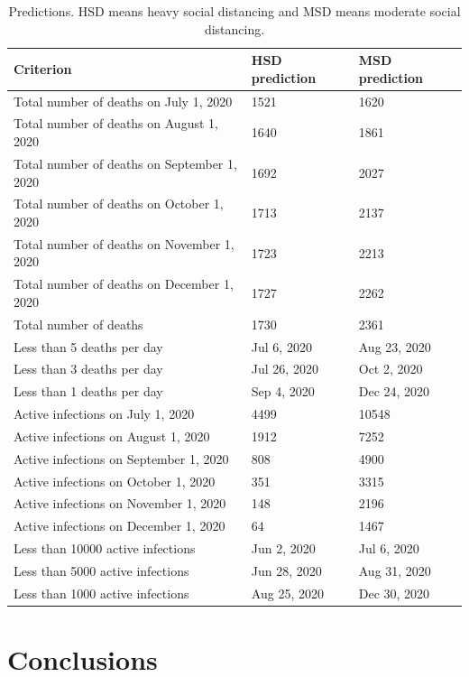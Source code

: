 \documentclass[11pt]{article}
\begin{document}
\begin{table}[H]
  \caption{Predictions. HSD means heavy social distancing and MSD means moderate social distancing.}
  \label{table:predictions}
  \centering
  \begin{tabular}{lll}
    \toprule
    Criterion & HSD prediction & MSD prediction \\
    \midrule
    Total number of deaths on July 1, 2020 & 1521 & 1620\\
    Total number of deaths on August 1, 2020 & 1640 & 1861\\
    Total number of deaths on September 1, 2020 & 1692 & 2027\\
    Total number of deaths on October 1, 2020 & 1713 & 2137\\
    Total number of deaths on November 1, 2020 & 1723 & 2213\\
    Total number of deaths on December 1, 2020 & 1727 & 2262\\
    Total number of deaths & 1730 & 2361 \\
    
    Less than 5 deaths per day & Jul 6, 2020 & Aug 23, 2020 \\
    Less than 3 deaths per day & Jul 26, 2020 & Oct 2, 2020 \\
    Less than 1 deaths per day & Sep 4, 2020 & Dec 24, 2020 \\
    \midrule
    Active infections on July 1, 2020 & 4499 & 10548 \\
    Active infections on August 1, 2020 & 1912 & 7252 \\
    Active infections on September 1, 2020 & 808 & 4900 \\
    Active infections on October 1, 2020 & 351 & 3315 \\
    Active infections on November 1, 2020 & 148 & 2196 \\
    Active infections on December 1, 2020 & 64 & 1467 \\
    
    Less than 10000 active infections & Jun 2, 2020 & Jul 6, 2020\\
    Less than 5000 active infections & Jun 28, 2020 & Aug 31, 2020\\
    Less than 1000 active infections & Aug 25, 2020 & Dec 30, 2020\\
    \bottomrule
  \end{tabular}
\end{table}

\section{Conclusions}
\end{document}
